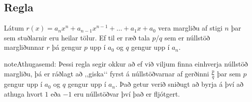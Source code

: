 \documentclass[a4paper,10pt,icelandic]{sphinxmanual}
\begin{document}
\subsection{Regla}
\label{\detokenize{Kafli06:id5}}
Látum \(r(x)=a_nx^n+a_{n-1}x^{n-1}+ \dots + a_1x+a_0\) vera margliðu af stigi \(n\) þar sem stuðlarnir eru heilar tölur. Ef til er ræð tala \(p/q\) sem er núllstöð margliðunnar \(r\) þá gengur \(p\) upp í \(a_0\) og \(q\) gengur upp í \(a_n\).

\begin{sphinxadmonition}{note}{Athugasemd:}
Þessi regla segir okkur að ef við viljum finna einhverja núllstöð margliðu, þá er ráðlagt að ,,giska‘‘ fyrst á núllstöðvarnar af gerðinni \(\frac{p}{q}\) þar sem \(p\) gengur upp í \(a_0\) og \(q\) gengur upp í \(a_n\). Það getur verið sniðugt að byrja á því að athuga hvort \(1\) eða \(-1\) eru núllstöðvar því það er fljótgert.
\end{sphinxadmonition}
\end{document}
